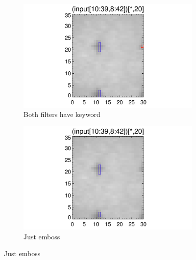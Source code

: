 \documentclass[10pt]{article}
\begin{document}
\begin{figure}[!h]
    \centering 
    \begin{subfigure}[b]{.45\linewidth}
        \centering
        \includegraphics[width=1.3\textwidth]{../plots_tables_images/fidcheck_withbothtruncate1.png}
        \caption{Both filters have keyword}
    \end{subfigure}
    \begin{subfigure}[b]{.45\linewidth}
        \centering
        \includegraphics[width=1.3\textwidth]{../plots_tables_images/fidcheck_withembosstruncate1.png}
        \caption{Just emboss}
    \end{subfigure}
   

\end{figure}
\end{document}
